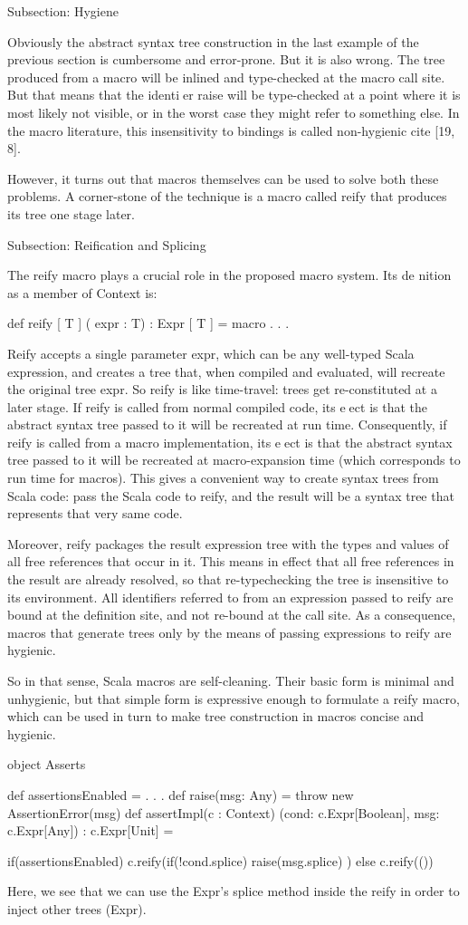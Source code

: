 Subsection: Hygiene

Obviously the abstract syntax tree construction in the last example of the
previous section is cumbersome and error-prone. But it is also wrong. The tree
produced from a macro will be inlined and type-checked at the macro call site.
But that means that the identier raise will be type-checked at a point where it
is most likely not visible, or in the worst case they might refer to something
else. In the macro literature, this insensitivity to bindings is called
non-hygienic {cite [19, 8]}.

However, it turns out that macros themselves can be used to solve both these
problems. A corner-stone of the technique is a macro called reify that produces
its tree one stage later.


Subsection: Reification and Splicing

The reify macro plays a crucial role in the proposed macro system. Its de
nition as a member of Context is:

def reify [ T ] ( expr : T) : Expr [ T ] = macro . . .

Reify accepts a single parameter expr, which can be any well-typed Scala
expression, and creates a tree that, when compiled and evaluated, will recreate
the original tree expr. So reify is like time-travel: trees get re-constituted
at a later stage. If reify is called from normal compiled code, its eect is
that the abstract syntax tree passed to it will be recreated at run time.
Consequently, if reify is called from a macro implementation, its eect is that
the abstract syntax tree passed to it will be recreated at macro-expansion time
(which corresponds to run time for macros). This gives a convenient way to
create syntax trees from Scala code: pass the Scala code to reify, and the
result will be a syntax tree that represents that very same code.

Moreover, reify packages the result expression tree with the types and values of
all free references that occur in it. This means in effect that all
free references in the result are already resolved, so that re-typechecking the
tree is insensitive to its environment. All identifiers referred to from
an expression passed to reify are bound at the definition site, and not re-bound
at the call site. As a consequence, macros that generate trees only by the means
of passing expressions to reify are hygienic.

So in that sense, Scala macros are self-cleaning. Their basic form is minimal
and unhygienic, but that simple form is expressive enough to formulate a
reify macro, which can be used in turn to make tree construction in
macros concise and hygienic.

object Asserts {
  def assertionsEnabled = . . .
  def raise(msg: Any) = throw new AssertionError(msg)
  def assertImpl(c : Context)
    (cond: c.Expr[Boolean], msg: c.Expr[Any])
    : c.Expr[Unit] = 
    
    if(assertionsEnabled)
      c.reify(if(!cond.splice) raise(msg.splice) )
    else
      c.reify(())
}

Here, we see that we can use the Expr's splice method inside the reify in order
to inject other trees (Expr).